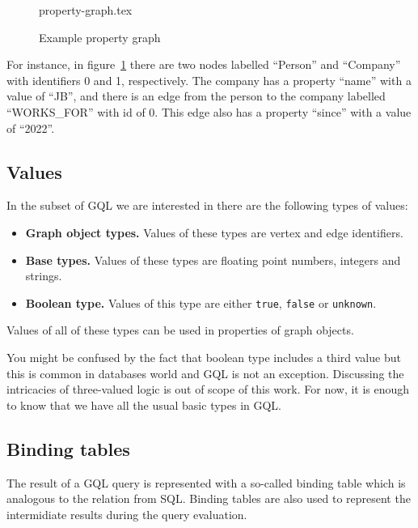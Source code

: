 \documentclass[14pt]{constructor-thesis}
\theoremstyle{definition}
\begin{document}
\begin{figure}[b]
  \centering
  
  {property-graph.tex}

  \caption{Example property graph}
  \label{fig:property-graph}
\end{figure}

For instance, in figure~\ref{fig:property-graph} there are two nodes labelled ``Person'' and ``Company'' with identifiers 0 and 1, respectively. The company has a property ``name'' with a value of ``JB'', and there is an edge from the person to the company labelled ``WORKS\_FOR'' with id of 0. This edge also has a property ``since'' with a value of ``2022''.

\subsection{Values}
\label{section:intro-values}

In the subset of GQL we are interested in there are the following types of values:
\begin{itemize}
  \item \textbf{Graph object types.} Values of these types are vertex and edge identifiers.
  \item \textbf{Base types.} Values of these types are floating point numbers, integers and strings. 
  \item \textbf{Boolean type.} Values of this type are either \texttt{true}, \texttt{false} or \texttt{unknown}.
\end{itemize}

Values of all of these types can be used in properties of graph objects.

You might be confused by the fact that boolean type includes a third value but this is common in databases world and GQL is not an exception. Discussing the intricacies of three-valued logic is out of scope of this work. For now, it is enough to know that we have all the usual basic types in GQL.

\subsection{Binding tables}
\label{section:intro-binding-tables}

The result of a GQL query is represented with a so-called binding table which is analogous to the relation from SQL. Binding tables are also used to represent the intermidiate results during the query evaluation.
\end{document}
